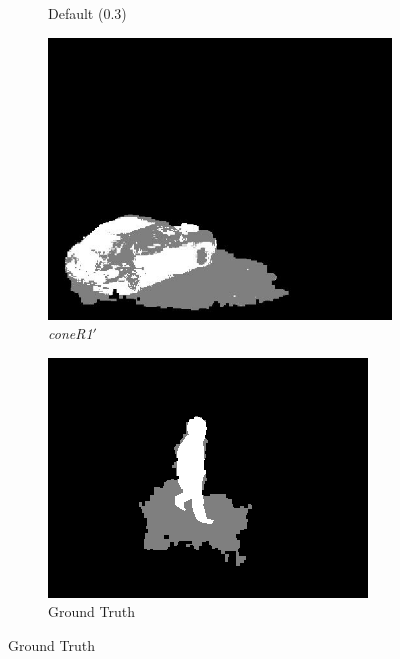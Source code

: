\begin{figure}
\begin{subfigure}{.32\linewidth}
  \caption{Default (0.3)}
  \end{subfigure}
  \hfill
  \begin{subfigure}{.32\linewidth}
  \includegraphics[width=1\linewidth]{figures/model/campus_0061_calc.jpg}
  \caption{\textit{coneR1}$'$}
  \end{subfigure}
  \begin{subfigure}{.32\linewidth}
  \includegraphics[width=1\linewidth]{figures/model/room_0275_gt.jpg}
  \caption{Ground Truth}
  \end{subfigure}

\end{figure}
